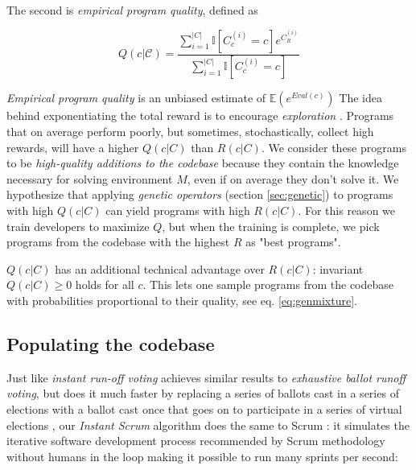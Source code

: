 The second is \emph{empirical program quality}, defined as

\begin{equation}
    Q(c|\mathcal{C}) = \frac{\sum\limits_{i=1}^{|C|} \mathbb{I}[C_c^{(i)}=c] e^{C_R^{(i)}}}{\sum\limits_{i=1}^{|C|} \mathbb{I}[C_c^{(i)}=c]}
    \label{eq:empquality}
\end{equation}

\emph{Empirical program quality} is an unbiased estimate of $\mathbb{E}(e^{\mathit{Eval}(c)})$
The idea behind exponentiating the total reward is to encourage \emph{exploration} \cite{exploration}.
Programs that on average perform poorly, but sometimes, stochastically, collect high rewards, will have a higher $Q(c|C)$ than $R(c|C)$.
We consider these programs to be \emph{high-quality additions to the codebase} because they contain the knowledge necessary for solving environment $M$, even if on average they don't solve it.
We hypothesize that applying \emph{genetic operators} (section \ref{sec:genetic}) to programs with high $Q(c|C)$ can yield programs with high $R(c|C)$.
For this reason we train developers to maximize $Q$, but when the training is complete, we pick programs from the codebase with the highest $R$ as "best programs".
 
$Q(c|C)$ has an additional technical advantage over $R(c|C)$: invariant $Q(c|C) \geq 0$ holds for all $c$.
This lets one sample programs from the codebase with probabilities proportional to their quality, see eq. \ref{eq:genmixture}.

\newpage \subsection{Populating the codebase}

Just like \emph{instant run-off voting} achieves similar results to \emph{exhaustive ballot runoff voting}, but does it much faster by replacing a series of ballots cast in a series of elections with a ballot cast once that goes on to participate in a series of virtual elections \cite{votingsystems}, our \emph{Instant Scrum} algorithm does the same to Scrum \cite{scrum}: it simulates the iterative software development process recommended by Scrum methodology without humans in the loop making it possible to run many sprints per second:

